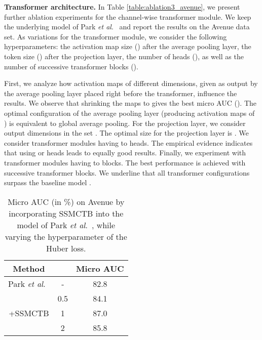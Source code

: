 \documentclass[10pt,journal,compsoc]{IEEEtran}
\newcommand{\etal}{\textit{et al}.}
\begin{document}
\noindent
\textbf{Transformer architecture.}
In Table \ref{table:ablation3_avenue}, we present further ablation experiments for the channel-wise transformer module. We keep the underlying model of Park \etal~\cite{Park-CVPR-2020} and report the results on the Avenue data set. As variations for the transformer module, we consider the following hyperparameters: the activation map size () after the average pooling layer, the token size () after the projection layer, the number of heads (), as well as the number of successive transformer blocks ().

First, we analyze how activation maps of different dimensions, given as output by the average pooling layer placed right before the transformer, influence the results. We observe that shrinking the maps to  gives the best micro AUC (). The optimal configuration of the average pooling layer (producing activation maps of ) is equivalent to global average pooling. For the projection layer, we consider output dimensions in the set . The optimal size for the projection layer is . We consider transformer modules having  to  heads. The empirical evidence indicates that using  or  heads leads to equally good results. Finally, we experiment with transformer modules having  to  blocks. The best performance is achieved with  successive transformer blocks. We underline that all transformer configurations surpass the baseline model \cite{Park-CVPR-2020}.

\begin{table}[!t]
\centering 
\caption{Micro AUC (in \%) on Avenue by incorporating SSMCTB into the model of Park \etal~\cite{Park-CVPR-2020}, while varying the hyperparameter  of the Huber loss.}
\label{tab_huber_ablation}
\vspace{-0.2cm}
\setlength\tabcolsep{4.0pt}
\small
\begin{tabular}{| c | c | c |} 
\hline
 {{Method}} &  &  Micro AUC  \\
 \hline
 \hline
  {Park \etal~\cite{Park-CVPR-2020}} & - & 82.8 \\
  \hline
  \multirow{3}{*}{+SSMCTB}  & 0.5 & 84.1 \\
  & 1 & 87.0 \\
  & 2 &  85.8 \\
  \hline
  \end{tabular}
\vspace{0.1cm}
\end{table}
\end{document}
